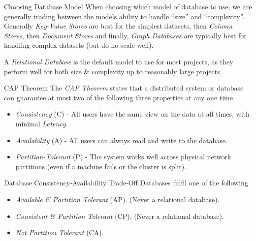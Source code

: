 \documentclass[11pt,a4paper]{article}
\begin{document}
  \begin{remark}{Choosing Database Model}
    When choosing which model of database to use, we are generally trading between the models ability to handle ``size'' and ``complexity''. Generally \textit{Key-Value Stores} are best for the simplest datasets, then \textit{Column Stores}, then \textit{Document Stores} and finally, \textit{Graph Databases} are typically best for handling complex datasets (but do no scale well).
    \par A \textit{Relational Database} is the default model to use for most projects, as they perform well for both size \& complexity up to reasonably large projects.
  \end{remark}

  \begin{theorem}{CAP Theorem}
    The \textit{CAP Theorem} states that a distributed system or database can guarantee at most two of the following three properties at any one time
    \begin{itemize}
      \item \textit{Consistency} (C) - All users have the same view on the data at all times, with minimal \textit{Latency}.
      \item \textit{Availability} (A) - All users can always read and write to the database.
      \item \textit{Partition-Tolerant} (P) - The system works well across physical network partitions (even if a machine fails or the cluster is split).
    \end{itemize}
  \end{theorem}

  \begin{proposition}{Database Consistency-Availability Trade-Off}
    Databases fulfil one of the following
    \begin{itemize}
      \item \textit{Available \& Partition Tolerant} (AP). (Never a relational database).
      \item \textit{Consistent \& Partition Tolerant} (CP). (Never a relational database).
      \item \textit{Not Partition Tolerant} (CA).
    \end{itemize}
  \end{proposition}
\end{document}
